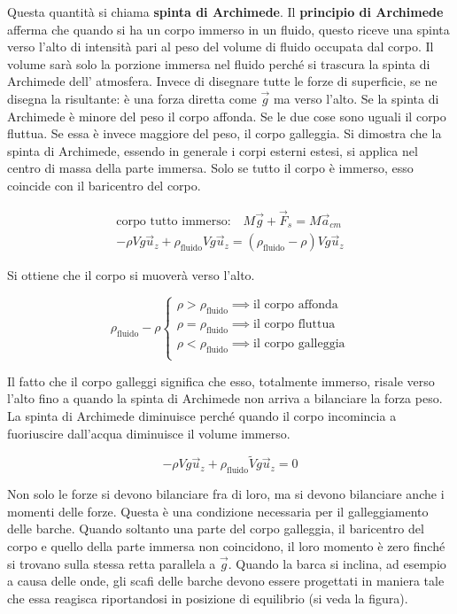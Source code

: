 Questa quantità si chiama \textbf{spinta di Archimede}. Il \textbf{principio di Archimede} afferma che quando si ha un corpo immerso in un fluido, questo riceve una spinta verso l'alto di intensità pari al peso del volume di fluido occupata dal corpo. Il volume sarà solo la porzione immersa nel fluido perché si trascura la spinta di Archimede dell' atmosfera. Invece di disegnare tutte le forze di superficie, se ne disegna la risultante: è una forza diretta come $\vec{g}$ ma verso l'alto. Se la spinta di Archimede è minore del peso il corpo affonda. Se le due cose sono uguali il corpo fluttua. Se essa è invece maggiore del peso, il corpo galleggia.
Si dimostra che la spinta di Archimede, essendo in generale i corpi esterni estesi, si applica nel centro di massa della parte immersa. Solo se tutto il corpo è immerso, esso coincide con il baricentro del corpo.

\begin{gather*}
	\text{corpo tutto immerso:} \quad M\vec{g} +\vec{F}_s = M\vec{a}_{cm} \\
	-\rho Vg\vec{u}_z + \rho_{\text{fluido} }Vg\vec{u}_z = (\rho_{\text{fluido} }- \rho)Vg\vec{u}_z
\end{gather*}

Si ottiene che il corpo si muoverà verso l'alto.

\[
	\rho_{\text{fluido} }-\rho \left\{ \begin{array}{l}
	 	\rho > \rho_{\text{fluido}} \implies \text{il corpo affonda} \\
	 	\rho = \rho_{\text{fluido}} \implies \text{il corpo fluttua} \\
	 	\rho < \rho_{\text{fluido}} \implies \text{il corpo galleggia} \\
	\end{array} \right.
\]

Il fatto che il corpo galleggi significa che esso, totalmente immerso, risale verso l'alto fino a quando la spinta di Archimede non arriva a bilanciare la forza peso. La spinta di Archimede diminuisce perché quando il corpo incomincia a fuoriuscire dall'acqua diminuisce il volume immerso.

\[
	-\rho Vg\vec{u}_z + \rho_{\text{fluido} }\widetilde{V}g\vec{u}_z=0
\]

Non solo le forze si devono bilanciare fra di loro, ma si devono bilanciare anche i momenti delle forze. Questa è una condizione necessaria per il galleggiamento delle barche. Quando soltanto una parte del corpo galleggia, il baricentro del corpo e quello della parte immersa non coincidono, il loro momento è zero finché si trovano sulla stessa retta parallela a $\vec{g}$.
Quando la barca si inclina, ad esempio a causa delle onde, gli scafi delle barche devono essere progettati in maniera tale che essa reagisca riportandosi in posizione di equilibrio (si veda la figura).


